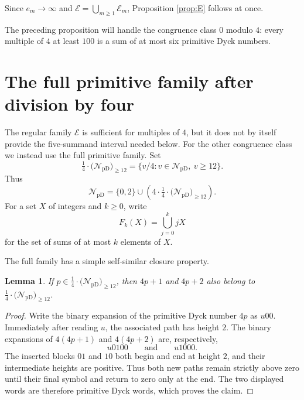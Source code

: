 \documentclass[12pt]{article}
\theoremstyle{plain}
\newtheorem{lemma}[theorem]{Lemma}
\newcommand{\NpD}{\mathcal{N}_{\mathrm{pD}}}
\newcommand{\Pset}{\tfrac14\cdot
  \bigl(\mathcal N_{\mathrm{pD}}\bigr)_{\ge 12}}
\begin{document}
Since $e_m\to\infty$ and $\mathcal E=\bigcup_{m\geq1}\mathcal E_m$,
Proposition \ref{prop:E} follows at once.

The preceding proposition will handle the congruence class $0$ modulo
$4$: every multiple of $4$ at least $100$ is a sum of at most six
primitive Dyck numbers.

\section{The full primitive family after division by four}

The regular family $\mathcal E$ is sufficient for multiples of $4$, but
it does not by itself provide the five-summand interval needed below.
For the other congruence class we instead use the full primitive family.
Set
\[
 \Pset=\{v/4:v\in\NpD,\ v\geq12\}.
\]
Thus
\[
 \NpD=\{0,2\}\cup(4\cdot\Pset).
\]
For a set $X$ of integers and $k\geq0$, write
\[
 F_k(X)=\bigcup_{j=0}^{k}jX
\]
for the set of sums of at most $k$ elements of $X$.

The full family has a simple self-similar closure property.

\begin{lemma}\label{lem:Pclosure}
If $p\in\Pset$, then $4p+1$ and $4p+2$ also belong to $\Pset$.
\end{lemma}

\begin{proof}
Write the binary expansion of the primitive Dyck number $4p$ as $u00$.
Immediately after reading $u$, the associated path has height $2$.  The
binary expansions of $4(4p+1)$ and $4(4p+2)$ are, respectively,
\[
 u0100\qquad\text{and}\qquad u1000.
\]
The inserted blocks $01$ and $10$ both begin and end at height $2$, and
their intermediate heights are positive.  Thus both new paths remain
strictly above zero until their final symbol and return to zero only at
the end.  The two displayed words are therefore primitive Dyck words,
which proves the claim.
\end{proof}
\end{document}
